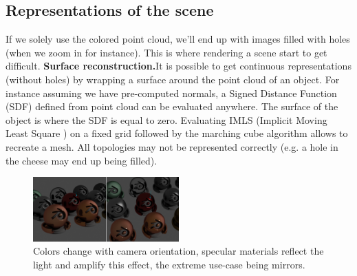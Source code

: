 \subsection{Representations of the scene}
\label{sec:representations}

If we solely use the colored point cloud, we'll end up with images filled with holes (when we zoom in for instance).
This is where rendering a scene start to get difficult. 
\noindent\textbf{Surface reconstruction.}It is possible to get continuous representations (without holes) by wrapping a surface around the point cloud of an object. For instance assuming we have pre-computed normals, a Signed Distance Function (SDF) defined from point cloud can be evaluated anywhere. The surface of the object is where the SDF is equal to zero. Evaluating IMLS (Implicit Moving Least Square \cite{kolluri2008IMLS}) on a fixed grid followed by the marching cube algorithm allows to recreate a mesh. All topologies may not be represented correctly (e.g. a hole in the cheese may end up being filled).


\begin{figure}[htbp]
    \centering
    \includegraphics[width=0.5\textwidth]{figures/material_appearance_commented.png}
    \caption{Colors change with camera orientation, specular materials reflect the light and amplify this effect, the extreme use-case being mirrors.}
    \label{fig:material_changes}
\end{figure}

